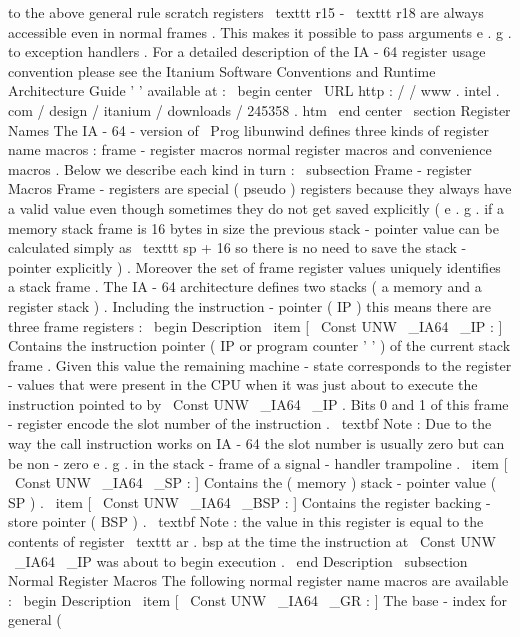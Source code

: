 to
the
above
general
rule
scratch
registers
\
texttt
{
r15
}
-
\
texttt
{
r18
}
are
always
accessible
even
in
normal
frames
.
This
makes
it
possible
to
pass
arguments
e
.
g
.
to
exception
handlers
.
For
a
detailed
description
of
the
IA
-
64
register
usage
convention
please
see
the
Itanium
Software
Conventions
and
Runtime
Architecture
Guide
'
'
available
at
:
\
begin
{
center
}
\
URL
{
http
:
/
/
www
.
intel
.
com
/
design
/
itanium
/
downloads
/
245358
.
htm
}
\
end
{
center
}
\
section
{
Register
Names
}
The
IA
-
64
-
version
of
\
Prog
{
libunwind
}
defines
three
kinds
of
register
name
macros
:
frame
-
register
macros
normal
register
macros
and
convenience
macros
.
Below
we
describe
each
kind
in
turn
:
\
subsection
{
Frame
-
register
Macros
}
Frame
-
registers
are
special
(
pseudo
)
registers
because
they
always
have
a
valid
value
even
though
sometimes
they
do
not
get
saved
explicitly
(
e
.
g
.
if
a
memory
stack
frame
is
16
bytes
in
size
the
previous
stack
-
pointer
value
can
be
calculated
simply
as
\
texttt
{
sp
+
16
}
so
there
is
no
need
to
save
the
stack
-
pointer
explicitly
)
.
Moreover
the
set
of
frame
register
values
uniquely
identifies
a
stack
frame
.
The
IA
-
64
architecture
defines
two
stacks
(
a
memory
and
a
register
stack
)
.
Including
the
instruction
-
pointer
(
IP
)
this
means
there
are
three
frame
registers
:
\
begin
{
Description
}
\
item
[
\
Const
{
UNW
\
_IA64
\
_IP
}
:
]
Contains
the
instruction
pointer
(
IP
or
program
counter
'
'
)
of
the
current
stack
frame
.
Given
this
value
the
remaining
machine
-
state
corresponds
to
the
register
-
values
that
were
present
in
the
CPU
when
it
was
just
about
to
execute
the
instruction
pointed
to
by
\
Const
{
UNW
\
_IA64
\
_IP
}
.
Bits
0
and
1
of
this
frame
-
register
encode
the
slot
number
of
the
instruction
.
\
textbf
{
Note
:
}
Due
to
the
way
the
call
instruction
works
on
IA
-
64
the
slot
number
is
usually
zero
but
can
be
non
-
zero
e
.
g
.
in
the
stack
-
frame
of
a
signal
-
handler
trampoline
.
\
item
[
\
Const
{
UNW
\
_IA64
\
_SP
}
:
]
Contains
the
(
memory
)
stack
-
pointer
value
(
SP
)
.
\
item
[
\
Const
{
UNW
\
_IA64
\
_BSP
}
:
]
Contains
the
register
backing
-
store
pointer
(
BSP
)
.
\
textbf
{
Note
:
}
the
value
in
this
register
is
equal
to
the
contents
of
register
\
texttt
{
ar
.
bsp
}
at
the
time
the
instruction
at
\
Const
{
UNW
\
_IA64
\
_IP
}
was
about
to
begin
execution
.
\
end
{
Description
}
\
subsection
{
Normal
Register
Macros
}
The
following
normal
register
name
macros
are
available
:
\
begin
{
Description
}
\
item
[
\
Const
{
UNW
\
_IA64
\
_GR
}
:
]
The
base
-
index
for
general
(
